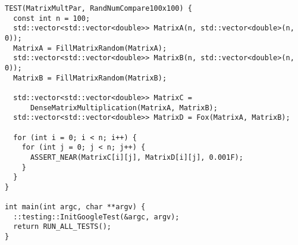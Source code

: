 \documentclass{report}
\begin{document}
\begin{lstlisting}
TEST(MatrixMultPar, RandNumCompare100x100) {
  const int n = 100;
  std::vector<std::vector<double>> MatrixA(n, std::vector<double>(n, 0));
  MatrixA = FillMatrixRandom(MatrixA);
  std::vector<std::vector<double>> MatrixB(n, std::vector<double>(n, 0));
  MatrixB = FillMatrixRandom(MatrixB);

  std::vector<std::vector<double>> MatrixC =
      DenseMatrixMultiplication(MatrixA, MatrixB);
  std::vector<std::vector<double>> MatrixD = Fox(MatrixA, MatrixB);

  for (int i = 0; i < n; i++) {
    for (int j = 0; j < n; j++) {
      ASSERT_NEAR(MatrixC[i][j], MatrixD[i][j], 0.001F);
    }
  }
}

int main(int argc, char **argv) {
  ::testing::InitGoogleTest(&argc, argv);
  return RUN_ALL_TESTS();
}
 \end{lstlisting}
\end{document}
